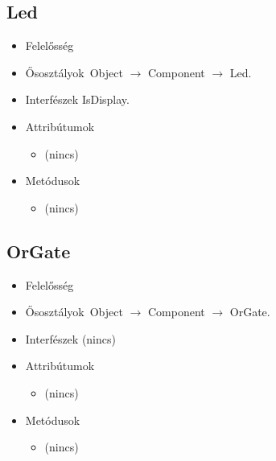 \subsection{Led}
\begin{itemize}
\item Felelősség\\

\item Ősosztályok\ Object $\rightarrow{}$ Component $\rightarrow{}$ Led.
\item Interfészek IsDisplay.
\item Attribútumok $\ $
\begin{itemize}
\item (nincs)
\end{itemize}
\item Metódusok$\ $
\begin{itemize}
\item (nincs)
\end{itemize}
\end{itemize}

\subsection{OrGate}
\begin{itemize}
\item Felelősség\\

\item Ősosztályok\ Object $\rightarrow{}$ Component $\rightarrow{}$ OrGate.
\item Interfészek (nincs)
\item Attribútumok $\ $
\begin{itemize}
\item (nincs)
\end{itemize}
\item Metódusok$\ $
\begin{itemize}
\item (nincs)
\end{itemize}
\end{itemize}

